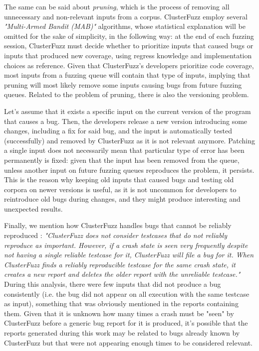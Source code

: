 The same can be said about \textit{pruning}, which is the process of removing all unnecessary and non-relevant inputs from a corpus. ClusterFuzz employ several \textit{"Multi-Armed Bandit (MAB)"} \cite{mab} algorithms, whose statistical explanation will be omitted for the sake of simplicity, in the following way: at the end of each fuzzing session, ClusterFuzz must decide whether to prioritize inputs that caused bugs or inputs that produced new coverage, using regress knowledge and implementation choices as reference. Given that ClusterFuzz's developers prioritize code coverage, most inputs from a fuzzing queue will contain that type of inputs, implying that pruning will most likely remove some inputs causing bugs from future fuzzing queues.
Related to the problem of pruning, there is also the versioning problem.

Let's assume that it exists a specific input on the current version of the program that causes a bug. Then, the developers release a new version introducing some changes, including a fix for said bug, and the input is automatically tested (successfully) and removed by ClusterFuzz as it is not relevant anymore. Patching a single input does not necessarily mean that particular type of error has been permanently is fixed: given that the input has been removed from the queue, unless another input on future fuzzing queues reproduces the problem, it persists. This is the reason why keeping old inputs that caused bugs and testing old corpora on newer versions is useful, as it is not uncommon for developers to reintroduce old bugs during changes, and they might produce interesting and unexpected results.

Finally, we mention how ClusterFuzz handles bugs that cannot be reliably reproduced \cite{unreliable}: 
\textit{"ClusterFuzz does not consider testcases that do not reliably reproduce as important. However, if a crash state is seen very frequently despite not having a single reliable testcase for it, ClusterFuzz will file a bug for it. When ClusterFuzz finds a reliably reproducible testcase for the same crash state, it creates a new report and deletes the older report with the unreliable testcase."}
During this analysis, there were few inputs that did not produce a bug consistently (i.e. the bug did not appear on all execution with the same testcase as input), something that was obviously mentioned in the reports containing them. Given that it is unknown how many times a crash must be "seen" by ClusterFuzz before a generic bug report for it is produced, it's possible that the reports generated during this work may be related to bugs already known by ClusterFuzz but that were not appearing enough times to be considered relevant.


